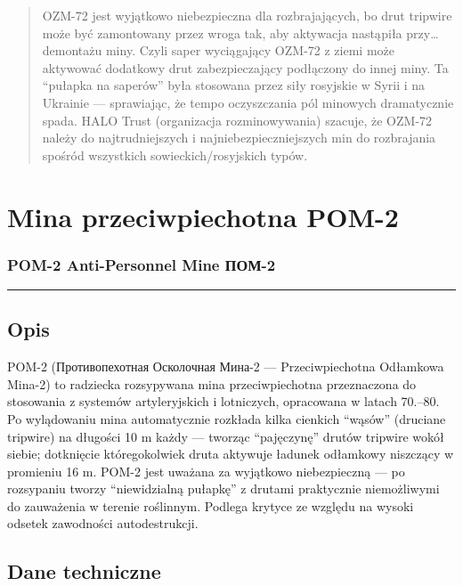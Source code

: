 \documentclass[12pt,openany,oneside]{book}
\begin{document}
\begin{quote}
OZM-72 jest wyjątkowo niebezpieczna dla rozbrajających, bo drut tripwire
może być zamontowany przez wroga tak, aby aktywacja nastąpiła
przy\ldots{} demontażu miny. Czyli saper wyciągający OZM-72 z ziemi może
aktywować dodatkowy drut zabezpieczający podłączony do innej miny. Ta
``pułapka na saperów'' była stosowana przez siły rosyjskie w Syrii i na
Ukrainie --- sprawiając, że tempo oczyszczania pól minowych dramatycznie
spada. HALO Trust (organizacja rozminowywania) szacuje, że OZM-72 należy
do najtrudniejszych i najniebezpieczniejszych min do rozbrajania spośród
wszystkich sowieckich/rosyjskich typów.
\end{quote}

\chapter{Mina przeciwpiechotna POM-2}\label{mina-przeciwpiechotna-pom-2}

\subsection{POM-2 Anti-Personnel Mine \textbar{}
ПОМ-2}\label{pom-2-anti-personnel-mine-ux43fux43eux43c-2}

\begin{center}\rule{0.5\linewidth}{0.5pt}\end{center}

\section{Opis}\label{opis-110}

POM-2 (Противопехотная Осколочная Мина-2 --- Przeciwpiechotna Odłamkowa
Mina-2) to radziecka rozsypywana mina przeciwpiechotna przeznaczona do
stosowania z systemów artyleryjskich i lotniczych, opracowana w latach
70.--80. Po wylądowaniu mina automatycznie rozkłada kilka cienkich
``wąsów'' (druciane tripwire) na długości 10 m każdy --- tworząc
``pajęczynę'' drutów tripwire wokół siebie; dotknięcie któregokolwiek
druta aktywuje ładunek odłamkowy niszczący w promieniu 16 m. POM-2 jest
uważana za wyjątkowo niebezpieczną --- po rozsypaniu tworzy
``niewidzialną pułapkę'' z drutami praktycznie niemożliwymi do
zauważenia w terenie roślinnym. Podlega krytyce ze względu na wysoki
odsetek zawodności autodestrukcji.

\section{Dane techniczne}\label{dane-techniczne-110}
\end{document}
